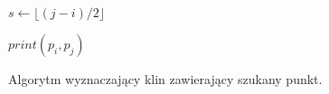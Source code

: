 \begin{figure}[htp]
  \begin{algorithmic}[1]


    \State

    \Else
    \EndIf

    \State

        \State $s \gets \lfloor (j-i)/2 \rfloor$

        \State

        \Else
        \EndIf
    \EndWhile

    \State

    \State $print(p_i, p_j)$

    \EndProcedure

    \end{algorithmic}
    \caption{Algorytm wyznaczający klin zawierający szukany
      punkt.\label{alg:findwedge}}
  \end{figure}

